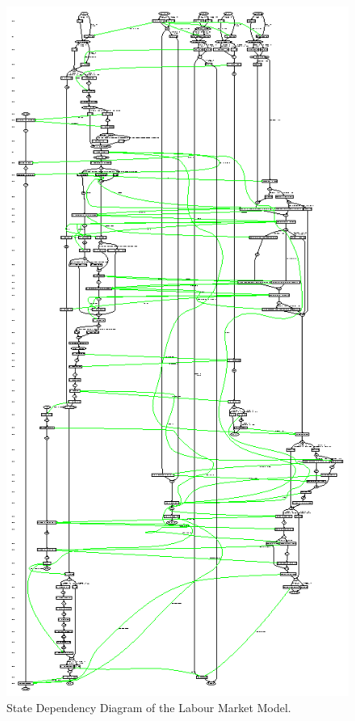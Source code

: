  \begin{figure}[!htb]
 \begin{center}
 \includegraphics*[scale=2.0]{stategraph-labour.ps}
 \caption{State Dependency Diagram of the Labour Market Model.} \label{fig:statelabour}
 \end{center}
 \end{figure}
